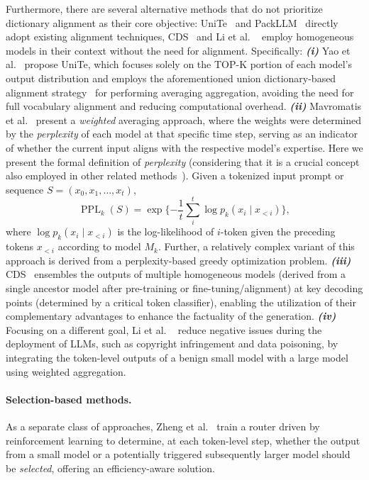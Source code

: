 \documentclass{article}
\begin{document}
Furthermore, there are several alternative methods that do not prioritize dictionary alignment as their core objective: UniTe~\cite{yao2024determine} and PackLLM~\cite{mavromatis2024pack} directly adopt existing alignment techniques,  CDS~\cite{jin2024collaborative} and Li et al. ~ employ homogeneous models in their context without the need for alignment.
Specifically:
\textbf{\textit{(i)}}
Yao et al.~ propose UniTe, which focuses solely on the TOP-K portion of each model’s output distribution and employs the aforementioned union dictionary-based alignment strategy~\cite{yu2024breaking} for performing averaging aggregation,  avoiding the need for full vocabulary alignment and reducing computational overhead.
\textbf{\textit{(ii)}}
Mavromatis et al.~ present a \textit{weighted} averaging approach, where the weights were determined by the \textit{perplexity} of each model at that specific time step, serving as an indicator of whether the current input aligns with the respective model's expertise.
Here we present the formal definition of \textit{perplexity} (considering that it is a crucial concept also employed in other related methods~\cite{liu2024cool,xu2025hit}).
Given a tokenized input prompt or sequence $S=(x_0, x_1, \ldots, x_t)$,
\begin{equation}
\operatorname{PPL}_k(S)=\exp \{-\frac{1}{t} \sum_i^t \log p_k(x_i\mid x_{<i})\},
\label{perplexity}
\end{equation}
where $\log p_k(x_i\mid x_{<i})$ is the log-likelihood of 
$i$-token given the preceding tokens $x_{<i}$ according to model $M_k$.
Further, a relatively complex variant of this approach is derived from a perplexity-based greedy optimization problem.
\textbf{\textit{(iii)}}
CDS~\cite{jin2024collaborative} ensembles the outputs of multiple homogeneous models (derived from a single ancestor model after pre-training or fine-tuning/alignment) at key decoding points (determined by a critical token classifier), enabling the utilization of their complementary advantages to enhance the factuality of the generation.
\textbf{\textit{(iv)}}
Focusing on a different goal,
Li et al. ~ reduce negative issues during the deployment of LLMs, such as copyright infringement and data poisoning, by integrating the token-level outputs of a benign small model with a large model using weighted aggregation.



\paragraph{Selection-based methods.}
As a separate class of approaches, Zheng et al.~ train a router driven by reinforcement learning to determine, at each token-level step, whether the output from a small model or a potentially triggered subsequently larger model should be \textit{selected}, offering an efficiency-aware solution.
\end{document}
